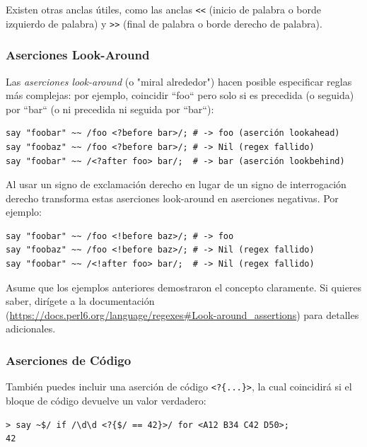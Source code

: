 Existen otras anclas útiles, como las anclas \verb|<<| (inicio de palabra 
o borde izquierdo de palabra) y \verb|>>| (final de palabra o
borde derecho de palabra).

\subsubsection{Aserciones Look-Around}


Las \emph{aserciones look-around} (o "miral alrededor") hacen posible especificar 
reglas más complejas: por ejemplo,  coincidir ``foo`` pero solo
si es precedida (o seguida) por ``bar`` (o ni precedida ni
seguida por ``bar``):
\begin{lstlisting}
say "foobar" ~~ /foo <?before bar>/; # -> foo (aserción lookahead)
say "foobaz" ~~ /foo <?before bar>/; # -> Nil (regex fallido)
say "foobar" ~~ /<?after foo> bar/;  # -> bar (aserción lookbehind)
\end{lstlisting}
%
Al usar un signo de exclamación derecho en lugar de un signo de
interrogación derecho transforma estas aserciones look-around 
en aserciones negativas. Por ejemplo:

\begin{lstlisting}
say "foobar" ~~ /foo <!before baz>/; # -> foo 
say "foobaz" ~~ /foo <!before baz>/; # -> Nil (regex fallido)
say "foobar" ~~ /<!after foo> bar/;  # -> Nil (regex fallido)
\end{lstlisting}
%
Asume que los ejemplos anteriores demostraron el concepto 
claramente. Si quieres saber, dirígete a la documentación
(\url{https://docs.perl6.org/language/regexes#Look-around_assertions}) 
para detalles adicionales. 

\subsubsection{Aserciones de Código}

También puedes incluir una aserción de código \verb|<?{...}>|,
la cual coincidirá si el bloque de código devuelve un valor
verdadero:

\begin{lstlisting}
> say ~$/ if /\d\d <?{$/ == 42}>/ for <A12 B34 C42 D50>;
42
\end{lstlisting}

